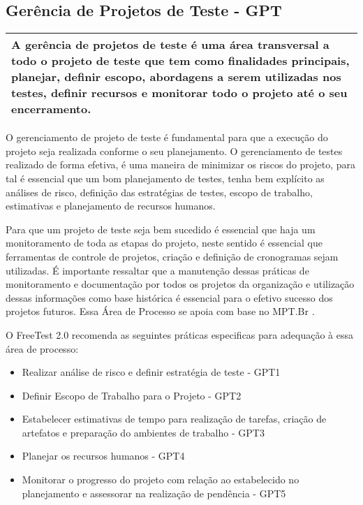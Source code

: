 \subsection{Gerência de Projetos de Teste - GPT}
\label{sec:gerenciadeprojetosdeteste}


\begin{table}[!ht]
\centering
\begin{tabular}{|p{130mm}|}
\hline
A gerência de projetos de teste é uma área transversal a todo o projeto de teste que tem como finalidades principais, planejar, definir escopo, abordagens a serem utilizadas nos testes, definir recursos e monitorar todo o projeto até o seu encerramento.\\
\hline
\end{tabular}
\end{table}

O gerenciamento de projeto de teste é fundamental para que a execução do projeto seja realizada conforme o seu planejamento. O gerenciamento de testes realizado de forma efetiva, é uma maneira de minimizar os riscos do projeto, para tal é essencial que um bom planejamento de testes, tenha bem explícito as análises de risco, definição das estratégias de testes, escopo de trabalho, estimativas e planejamento de recursos humanos.

Para que um projeto de teste seja bem sucedido é essencial que haja um monitoramento de toda as etapas do projeto, neste sentido é essencial que ferramentas de controle de projetos, criação e definição de cronogramas sejam utilizadas. É importante ressaltar que a manutenção dessas práticas de monitoramento e documentação por todos os projetos da organização e utilização dessas informações como base histórica é essencial para o efetivo sucesso dos projetos futuros. Essa Área de Processo se apoia com base no MPT.Br \cite{GuiaMPTbr}.

O FreeTest 2.0 recomenda as seguintes práticas especificas para adequação à essa área de processo:

\begin{itemize}    
    \item Realizar análise de risco e definir estratégia de teste - GPT1
    \item Definir Escopo de Trabalho para o Projeto - GPT2
    \item Estabelecer estimativas de tempo para realização de tarefas, criação de artefatos e preparação do ambientes de trabalho - GPT3
    \item Planejar os recursos humanos - GPT4
    \item Monitorar o progresso do projeto com relação ao estabelecido no planejamento e assessorar na realização de pendência - GPT5
\end{itemize}

